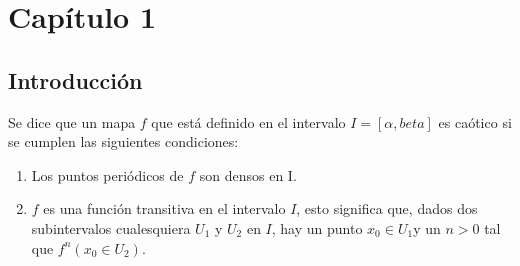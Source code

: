 \chapter*{Capítulo 1}
\label{JAJAJA}
\section{Introducción}

Se dice que un mapa $f$ que está definido en el intervalo $I= [\alpha, beta]$ es caótico si se cumplen las siguientes condiciones:

\begin{enumerate}
\item Los puntos periódicos de $f$ son densos en I.
\item $f$ es una función transitiva en el intervalo $I$, esto significa que, dados dos subintervalos cualesquiera $U_{1}$ y $U_{2}$ en $I$, hay un punto $x_{0} \in U_{1}$y un $n>0$ tal que $f^{n}(x_{0} \in U_{2})$.
\end{enumerate}